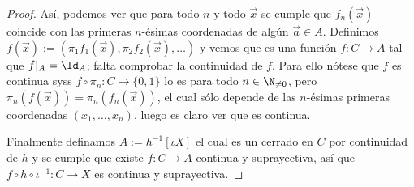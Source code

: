 \documentclass[topologia-analisis.tex]{subfiles}
\begin{document}
\begin{proof}
	Así, podemos ver que para todo $n$ y todo $\vec x$ se cumple que $f_n(\vec x)$ coincide con las primeras $n$-ésimas coordenadas
	de algún $\vec a \in A$.
	Definimos $f(\vec x) := (\pi_1 f_1(\vec x), \pi_2 f_2(\vec x), \dots)$ y vemos que es una función $f\colon C \to A$ tal que $f|_A = \Id_A$;
	falta comprobar la continuidad de $f$.
	Para ello nótese que $f$ es continua syss $f\circ\pi_n\colon C \to \{ 0, 1 \}$ lo es para todo $n\in\N_{\ne 0}$,
	pero $\pi_n(f(\vec x)) = \pi_n(f_n(\vec x))$, el cual sólo depende de las $n$-ésimas primeras coordenadas $(x_1, \dots, x_n)$,
	luego es claro ver que es continua.

	Finalmente definamos $A := h^{-1}[ \iota X ]$ el cual es un cerrado en $C$ por continuidad de $h$ y se cumple que existe
	$f\colon C \to A$ continua y suprayectiva, así que $f\circ h\circ\iota^{-1} \colon C \to X$ es continua y suprayectiva.
\end{proof}


\end{document}
